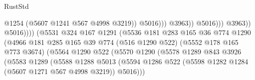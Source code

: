 \begin{lexlean}{RustStd}
\begin{coremodule}
                                                                  @1254
                                                                  (@5607 @1241 @567 @4998 @3219))
                                                                @5016)))
                                                          @3963))
                                                      @5016)))
                                                @3963))
                                            @5016))))
                                    (@5531
                                      @324
                                      @167
                                      @1291
                                      (@5536
                                        @181
                                        @283
                                        @165
                                        @36
                                        @774
                                        @1290
                                        (@4966
                                          @181
                                          @285
                                          @165
                                          @39
                                          @774
                                          (@516 @1290 @522)
                                          (@5552 @178 @165 @773 @3674)
                                          (@5564
                                            @1290
                                            @522
                                            (@5570
                                              @1290
                                              (@5578
                                                @1289
                                                @843
                                                @3926
                                                (@5583
                                                  @1289
                                                  (@5588
                                                    @1288
                                                    @5013
                                                    (@5594
                                                      @1286
                                                      @522
                                                      (@5598
                                                        @1282
                                                        @1284
                                                        (@5607 @1271 @567 @4998 @3219))
                                                      @5016)))

\end{coremodule}
\end{lexlean}

